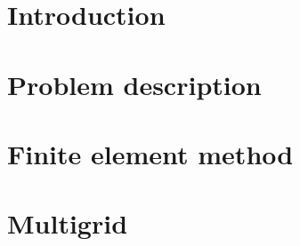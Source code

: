 \documentclass[12pt,MSc,twoside]{muthesis}
\begin{document}
\iffalse 
	 
\fi


\chapter{Introduction}


\chapter{Problem description}


\chapter{Finite element method}


\chapter{Multigrid}




\end{document}
